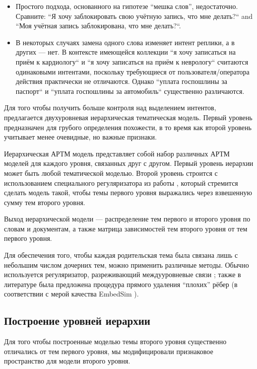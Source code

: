 \begin{itemize}
\item Простого подхода, основанного на гипотезе ``мешка слов'', недостаточно. Сравните: ``Я хочу заблокировать свою учётную запись, что мне делать?`` and ``Моя учётная запись заблокирована, что мне делать?``.
\item В некоторых случаях замена одного слова изменяет интент реплики, а в других --- нет. В контексте имеющейся коллекции ``я хочу записаться на приём к кардиологу`` и ``я хочу записаться на приём к неврологу`` считаются одинаковыми интентами, поскольку требующиеся от пользователя/оператора действия практически не отличаются. Однако ``уплата госпошлины за паспорт`` и ``уплата госпошлины за автомобиль`` существенно различаются. 
\end{itemize}

Для того чтобы получить больше контроля над выделением интентов, предлагается двухуровневая иерархическая тематическая модель. Первый уровень предназначен для грубого определения похожести, в то время как второй уровень учитывает менее очевидные, но важные признаки.

Иерархическая АРТМ модель представляет собой набор различных АРТМ моделей для каждого уровня, связанных друг с другом. Первый уровень иерархии может быть любой тематической моделью. Второй уровень строится с использованием специального регуляризатора из работы \cite{chirkova2016additive}, который стремится сделать модель такой, чтобы темы первого уровня выражались через взвешенную сумму тем второго уровня.

Выход иерархической модели — распределение тем первого и второго уровня по словам и документам, а также матрица зависимостей тем второго уровня от тем первого уровня.

Для обеспечения того, чтобы каждая родительская тема была связана лишь с небольшим числом дочерних тем, можно применить различные методы. Обычно используется регуляризатор, разреживающий междууровневые связи \cite{chirkova2016additive} ; также в литературе была предложена процедура прямого удаления ``плохих'' рёбер (в соответствии с мерой качества EmbedSim \cite{belyy}).

\subsection{Построение уровней иерархии} \label{hierarchy_distinct}

Для того чтобы построенные моделью темы второго уровня существенно отличались от тем первого уровня, мы модифицировали признаковое пространство для модели второго уровня.


